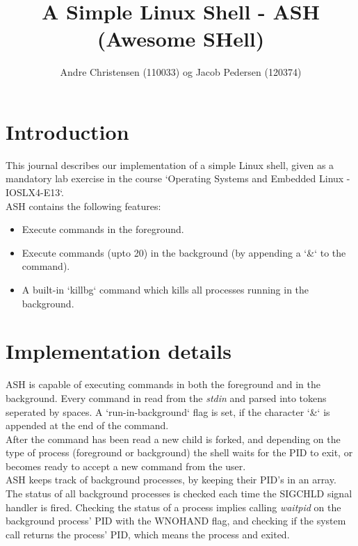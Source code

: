 \documentclass[pdftex, a4paper,12pt]{article}
\title{A Simple Linux Shell - ASH (Awesome SHell)}
\author{Andre Christensen (110033) og Jacob Pedersen (120374)}
\begin{document}
\maketitle
\newpage

\tableofcontents
\newpage

\section{Introduction}

This journal describes our implementation of a simple Linux shell, given as a mandatory lab exercise in the course `Operating Systems and Embedded Linux - IOSLX4-E13`.\\

ASH contains the following features:

\begin{itemize}
	\item Execute commands in the foreground.
	\item Execute commands (upto 20) in the background (by appending a `\&` to the command).
	\item A built-in `killbg` command which kills all processes running in the background.
\end{itemize}



\section{Implementation details}

ASH is capable of executing commands in both the foreground and in the background. Every command in read from the \emph{stdin} and parsed into tokens seperated by spaces. A `run-in-background` flag is set, if the character `\&` is appended at the end of the command.\\

After the command has been read a new child is forked, and depending on the type of process (foreground or background) the shell waits for the PID to exit, or becomes ready to accept a new command from the user.\\

ASH keeps track of background processes, by keeping their PID's in an array. The status of all background processes is checked each time the SIGCHLD signal handler is fired. Checking the status of a process implies calling \emph{waitpid} on the background process' PID with the WNOHAND flag, and checking if the system call returns the process' PID, which means the process and exited.
\end{document}
